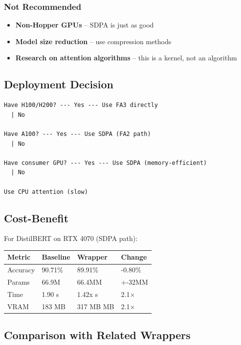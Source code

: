 \subsubsection{Not Recommended}
\begin{itemize}
\item \textbf{Non-Hopper GPUs} -- SDPA is just as good
\item \textbf{Model size reduction} -- use compression methods
\item \textbf{Research on attention algorithms} -- this is a kernel, not an algorithm

\end{itemize}
\subsection{Deployment Decision}

\begin{lstlisting}
Have H100/H200? --- Yes --- Use FA3 directly
  | No
   
Have A100? --- Yes --- Use SDPA (FA2 path)
  | No
   
Have consumer GPU? --- Yes --- Use SDPA (memory-efficient)
  | No
   
Use CPU attention (slow)
\end{lstlisting}

\subsection{Cost-Benefit}

For DistilBERT on RTX 4070 (SDPA path):

\begin{table}[H]
\centering
\small
\begin{tabular}{llll}
\toprule
\textbf{Metric} & \textbf{Baseline} & \textbf{Wrapper} & \textbf{Change} \\
\midrule
Accuracy & 90.71\% & 89.91\% & -0.80\% \\
Params & 66.9M & 66.4MM & +-32MM \\
Time & 1.90 s & 1.42x s & 2.1$\times$ \\
VRAM & 183 MB & 317 MB MB & 2.1$\times$ \\
\bottomrule
\end{tabular}
\end{table}

\subsection{Comparison with Related Wrappers}

